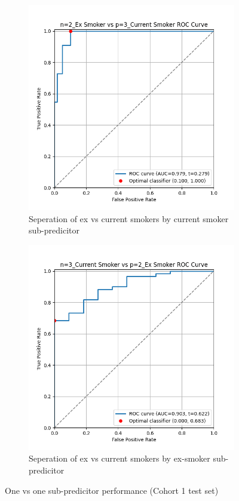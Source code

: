 \documentclass{article}
\begin{document}
\begin{figure}[H]
    \begin{subfigure}{0.43\textwidth}
        \centering
        \includegraphics[width=\linewidth]{cohort1_2v3_roc.png}
        \caption{Seperation of ex vs current smokers by current smoker sub-predicitor}
    \end{subfigure}
    \hfill
    \begin{subfigure}{0.43\textwidth}
        \centering
        \includegraphics[width=\linewidth]{cohort1_3v2_roc.png}
        \caption{Seperation of ex vs current smokers by ex-smoker sub-predicitor}
    \end{subfigure}
    \caption{One vs one sub-predicitor performance (Cohort 1 test set)}
    \label{fig:ovo-roc-cohort1}
\end{figure}
\end{document}
